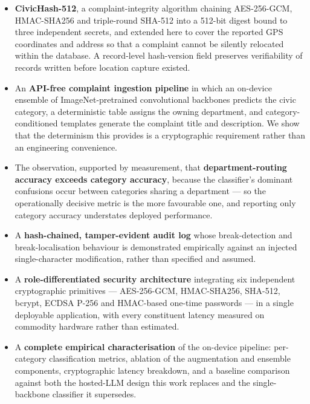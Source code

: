 \documentclass[conference]{IEEEtran}
\begin{document}
\begin{itemize}
\item \textbf{CivicHash-512}, a complaint-integrity algorithm chaining AES-256-GCM, HMAC-SHA256 and triple-round SHA-512 into a 512-bit digest bound to three independent secrets, and extended here to cover the reported GPS coordinates and address so that a complaint cannot be silently relocated within the database. A record-level hash-version field preserves verifiability of records written before location capture existed.

\item An \textbf{API-free complaint ingestion pipeline} in which an on-device ensemble of ImageNet-pretrained convolutional backbones predicts the civic category, a deterministic table assigns the owning department, and category-conditioned templates generate the complaint title and description. We show that the determinism this provides is a cryptographic requirement rather than an engineering convenience.

\item The observation, supported by measurement, that \textbf{department-routing accuracy exceeds category accuracy}, because the classifier's dominant confusions occur between categories sharing a department --- so the operationally decisive metric is the more favourable one, and reporting only category accuracy understates deployed performance.

\item A \textbf{hash-chained, tamper-evident audit log} whose break-detection and break-localisation behaviour is demonstrated empirically against an injected single-character modification, rather than specified and assumed.

\item A \textbf{role-differentiated security architecture} integrating six independent cryptographic primitives --- AES-256-GCM, HMAC-SHA256, SHA-512, bcrypt, ECDSA P-256 and HMAC-based one-time passwords --- in a single deployable application, with every constituent latency measured on commodity hardware rather than estimated.

\item A \textbf{complete empirical characterisation} of the on-device pipeline: per-category classification metrics, ablation of the augmentation and ensemble components, cryptographic latency breakdown, and a baseline comparison against both the hosted-LLM design this work replaces and the single-backbone classifier it supersedes.
\end{itemize}
\end{document}
